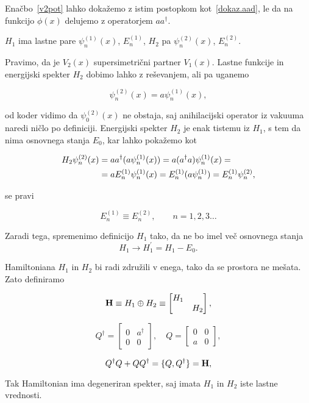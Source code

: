 Ena\v cbo~\eqref{v2pot} lahko doka\v zemo z istim postopkom kot~\eqref{dokaz.aad}, le da na funkcijo $\phi(x)$
delujemo z operatorjem $aa^\dagger$.

$H_1$ ima lastne pare $\psi^{(1)}_n(x)$, $E^{(1)}_n$, $H_2$ pa $\psi^{(2)}_n(x)$, $E^{(2)}_n$.

Pravimo, da je $V_2(x)$ supersimetri\v cni partner $V_1(x)$. Lastne funkcije in energijski spekter $H_2$
dobimo lahko z re\v sevanjem, ali pa uganemo

\begin{equation}
	\psi^{(2)}_n(x) = a\psi^{(1)}_n(x),
\end{equation}

od koder vidimo da $\psi^{(2)}_0(x)$ ne obstaja, saj anihilacijski operator iz vakuuma naredi
ni\v clo po definiciji. Energijski spekter $H_2$ je enak tistemu iz $H_1$, s tem da nima
osnovnega stanja $E_0$, kar lahko poka\v zemo kot

\begin{align}
	H_2\psi^{(2)}_n(x) &= aa^\dagger (a\psi^{(1)}_n(x)) = a(a^\dagger a)\psi^{(1)}_n(x) = \notag \\
		&= aE^{(1)}_n\psi^{(1)}_n(x) = E_n^{(1)}(a\psi_n^{(1)}) = E_n^{(1)}\psi_n^{(2)},
\end{align}

se pravi

\begin{equation}
	E^{(1)}_n \equiv E^{(2)}_n, \qquad n = 1, 2, 3 \ldots
\end{equation}

Zaradi tega, spremenimo definicijo $H_1$ tako, da ne bo imel ve\v c osnovnega stanja
\begin{equation}
	H_1 \to H_1^\prime = H_1 - E_0.
\end{equation}

Hamiltoniana $H_1$ in $H_2$ bi radi zdru\v zili v enega, tako da se prostora ne me\v sata. Zato
definiramo

\begin{equation}
	\mathbf{H} \equiv H_1 \oplus H_2 \equiv \begin{bmatrix}H_1 & \\
		& H_2 \end{bmatrix},
\end{equation}

\begin{equation}
	Q^\dagger = \begin{bmatrix} 0 & a^\dagger \\
		0 & 0 \end{bmatrix}, \quad
	Q = \begin{bmatrix} 0 & 0 \\
		a & 0 \end{bmatrix},
\end{equation}

\begin{equation}
	Q^\dagger Q + QQ^\dagger = \{Q, Q^\dagger\} = \mathbf{H},
\end{equation}

Tak Hamiltonian ima degeneriran spekter, saj imata $H_1$ in $H_2$ iste lastne vrednosti.


